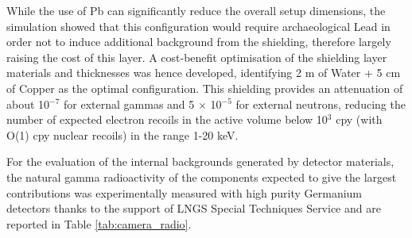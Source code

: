 \documentclass[physics,article,submit,moreauthors,pdftex]{Definitions/mdpi}
\begin{document}
While the use of Pb can significantly reduce the overall setup dimensions, the simulation showed that this configuration would require archaeological Lead in order not to induce additional background from the shielding, therefore largely raising the cost of this layer. A cost-benefit optimisation of the shielding layer materials and thicknesses was hence developed, identifying 2 m of Water + 5 cm of Copper as the optimal configuration. This shielding provides an attenuation of about 10$^{−7}$ for external gammas and 5 $\times$ 10$^{−5}$ for external neutrons, reducing the number of expected electron recoils in the active volume below 10$^3$ cpy (with O(1) cpy nuclear recoils) in the range 1-20 keV. 

\begin{table}[t]
    \centering
    \caption{Measured activity of the internal detector components expected to produce the largest backgrounds in the active volume. The isotopes in parentheses indicate the activity from that particular part of the decay chain. Upper limits are given at 90$\%$ confidence level.}
    \label{tab:camera_radio}
\end{table}

 

For the evaluation of the internal backgrounds generated by detector materials, the natural gamma radioactivity of the components expected to give the largest contributions was experimentally measured with high purity Germanium detectors thanks to the support of LNGS Special Techniques Service and are reported in Table \ref{tab:camera_radio}. 
\end{document}
